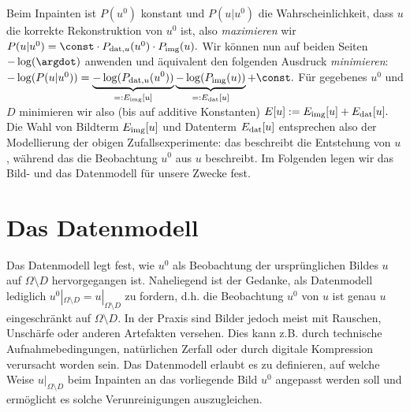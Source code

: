 \documentclass{mythesis}
\begin{document}
Beim Inpainten ist $P(u^0)$ konstant und $P(u|u^0)$ die Wahrscheinlichkeit, dass $u$ die korrekte Rekonstruktion von $u^0$ ist, also \emph{maximieren} wir
\begin{math}
    P(u|u^0) = \const \cdot P_{\mathrm{dat},u}(u^0) \cdot P_{\mathrm{img}}(u).
\end{math}
Wir können nun auf beiden Seiten $-\log(\argdot)$ anwenden und äquivalent den folgenden Ausdruck \emph{minimieren}:
\begin{math}
    -\log(P(u|u^0)) = \underbrace{-\log(P_{\mathrm{dat},u}(u^0))}_{=:E_{\mathrm{img}}[u]} \underbrace{-\log(P_{\mathrm{img}}(u))}_{=:E_{\mathrm{dat}}[u]} + \const.
\end{math}
Für gegebenes $u^0$ und $D$ minimieren wir also (bis auf additive Konstanten)
\begin{math}
    E[u] := E_{\mathrm{img}}[u] + E_{\mathrm{dat}}[u].
\end{math}
Die Wahl von Bildterm $E_{\mathrm{img}}[u]$ und Datenterm $E_{\mathrm{dat}}[u]$ entsprechen also der Modellierung der obigen Zufallsexperimente:
das  beschreibt die Entstehung von $u$, während das  die Beobachtung $u^0$ aus $u$ beschreibt.
Im Folgenden legen wir das Bild- und das Datenmodell für unsere Zwecke fest.



%
%
%

\section{Das Datenmodell}

Das Datenmodell legt fest, wie $u^0$ als Beobachtung der ursprünglichen Bildes $u$ auf $\Omega \setminus D$ hervorgegangen ist.
Naheliegend ist der Gedanke, als Datenmodell lediglich $u^0|_{\Omega \setminus D} = u|_{\Omega \setminus D}$ zu fordern, d.h. die Beobachtung $u^0$ von $u$ ist genau $u$ eingeschränkt auf $\Omega \setminus D$.
In der Praxis sind Bilder jedoch meist mit Rauschen, Unschärfe oder anderen Artefakten versehen.
Dies kann z.B. durch technische Aufnahmebedingungen, natürlichen Zerfall oder durch digitale Kompression verursacht worden sein.
Das Datenmodell erlaubt es zu definieren, auf welche Weise $u|_{\Omega \setminus D}$ beim Inpainten an das vorliegende Bild $u^0$ angepasst werden soll und ermöglicht es solche Verunreinigungen auszugleichen.
\end{document}

